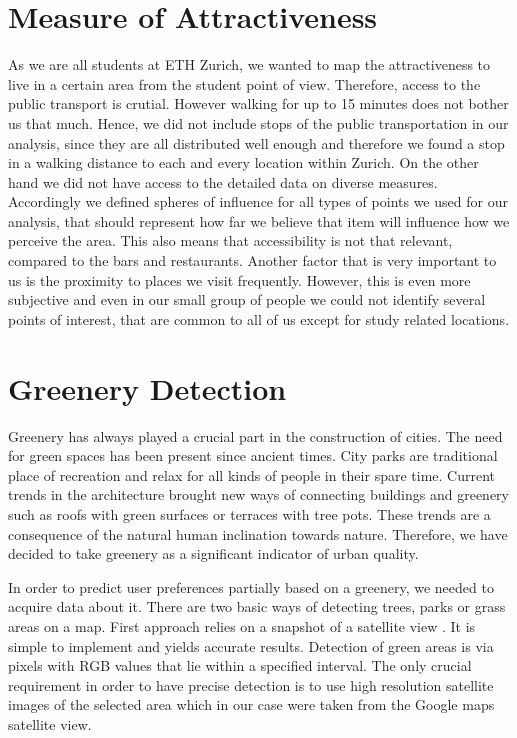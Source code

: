 \documentclass[letterpaper]{article}
\begin{document}
\section{Measure of Attractiveness}\label{sec:attractiveness}
As we are all students at ETH Zurich, we wanted to map the attractiveness to live in a certain area from the student point of view.
Therefore, access to the public transport is crutial. However walking for up to 15 minutes does not bother us that much. Hence, we did not
include stops of the public transportation in our analysis, since they are all distributed well enough and therefore we found a stop in a walking 
distance to each and every location within Zurich.
On the other hand we did not have access to the detailed data on diverse measures. Accordingly we defined spheres of influence for all types
of points we used for our analysis, that should represent how far we believe that item will influence how we perceive the area.
This also means that accessibility is not that relevant, compared to the bars and restaurants. Another factor that is
very important to us is the proximity to places we visit frequently. However, this is even more subjective and even in our
small group of people we could not identify several points of interest, that are common to all of us except for study related locations.

\section{Greenery Detection}\label{sec:greenery}
\indent Greenery has always played a crucial part in the construction of cities. The need for green spaces has been present since ancient times.
City parks are traditional place of recreation and relax for all kinds of people in their spare time. Current trends in the architecture brought new ways of
connecting buildings and greenery such as roofs with green surfaces or terraces with tree pots. These trends are a consequence of the natural
human inclination towards nature. Therefore, we have decided to take greenery as a significant indicator of urban quality.

\indent In order to predict user preferences partially based on a greenery, we needed to acquire data about it. There are two basic ways of detecting trees,
parks or grass areas on a map. First approach relies on a snapshot of a satellite view \cite{smartCities}. It is simple to implement and yields accurate results.
Detection of green areas is via pixels with RGB values that lie within a specified interval. The only crucial requirement in order to have precise detection
is to use high resolution satellite images of the selected area which in our case were taken from the Google maps satellite view.
\end{document}
